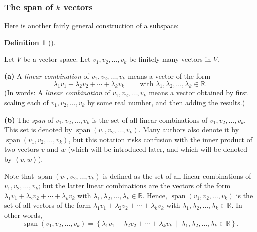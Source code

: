 \documentclass[numbers=enddot,12pt,final,onecolumn,notitlepage]{scrartcl}%
\theoremstyle{definition}
\newtheorem{defi}[theo]{Definition}
\newenvironment{definition}[1][]
{\begin{defi}[#1]\begin{leftbar}}
{\end{leftbar}\end{defi}}
\begin{document}
\subsubsection{The span of $k$ vectors}

Here is another fairly general construction of a subspace:

\begin{definition}
\label{def.subspace.span}Let $V$ be a vector space. Let $v_{1},v_{2}%
,\ldots,v_{k}$ be finitely many vectors in $V$.

\textbf{(a)} A \textit{linear combination} of $v_{1},v_{2},\ldots,v_{k}$ means
a vector of the form%
\[
\lambda_{1}v_{1}+\lambda_{2}v_{2}+\cdots+\lambda_{k}v_{k}%
\ \ \ \ \ \ \ \ \ \ \text{with }\lambda_{1},\lambda_{2},\ldots,\lambda_{k}%
\in\mathbb{R}.
\]
(In words: A \textit{linear combination} of $v_{1},v_{2},\ldots,v_{k}$ means a
vector obtained by first scaling each of $v_{1},v_{2},\ldots,v_{k}$ by some
real number, and then adding the results.)

\textbf{(b)} The \textit{span} of $v_{1},v_{2},\ldots,v_{k}$ is the set of all
linear combinations of $v_{1},v_{2},\ldots,v_{k}$. This set is denoted by
$\operatorname*{span}\left(  v_{1},v_{2},\ldots,v_{k}\right)  $. Many authors
also denote it by $\operatorname{span}\left(  v_{1},v_{2},\ldots,v_{k}\right)
$, but this notation risks confusion with the inner product of two vectors $v$
and $w$ (which will be introduced later, and which will be denoted by $\left<
v,w\right>  $).

Note that $\operatorname{span}\left(  v_{1},v_{2},\ldots,v_{k}\right)  $ is
defined as the set of all linear combinations of $v_{1},v_{2},\ldots,v_{k}$;
but the latter linear combinations are the vectors of the form $\lambda
_{1}v_{1}+\lambda_{2}v_{2}+\cdots+\lambda_{k}v_{k}$ with $\lambda_{1}%
,\lambda_{2},\ldots,\lambda_{k}\in\mathbb{R}$. Hence, $\operatorname{span}%
\left(  v_{1},v_{2},\ldots,v_{k}\right)  $ is the set of all vectors of the
form $\lambda_{1}v_{1}+\lambda_{2}v_{2}+\cdots+\lambda_{k}v_{k}$ with
$\lambda_{1},\lambda_{2},\ldots,\lambda_{k}\in\mathbb{R}$. In other words,%
\begin{equation}
\operatorname{span}\left(  v_{1},v_{2},\ldots,v_{k}\right)  =\left\{
\lambda_{1}v_{1}+\lambda_{2}v_{2}+\cdots+\lambda_{k}v_{k}\ \mid\ \lambda
_{1},\lambda_{2},\ldots,\lambda_{k}\in\mathbb{R}\right\}  .
\label{eq.def.subspace.span.explicit}%
\end{equation}

\end{definition}
\end{document}

